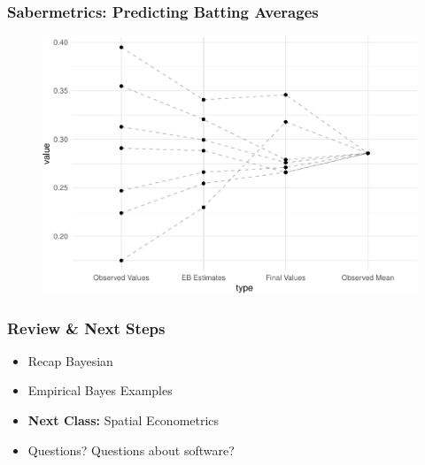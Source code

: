 \documentclass[
  shownotes,
  xcolor={svgnames},
  hyperref={colorlinks,citecolor=DarkBlue,linkcolor=DarkRed,urlcolor=DarkBlue}
  ]{beamer}
\begin{document}
\begin{frame}[fragile]
\frametitle{Sabermetrics: Predicting Batting Averages}

\begin{figure}[H] \centering
  \centering
  \includegraphics[scale=0.5]{figures/shrinkage_future}
  \\
  \tiny 
\end{figure}



\end{frame}
\begin{frame}
\frametitle{Review \& Next Steps}
  
  \begin{itemize} 
    \item Recap Bayesian
    \medskip
    \item Empirical Bayes Examples
    
  \bigskip  

  
  \item  {\bf Next Class:} Spatial Econometrics
  \bigskip
  \item Questions? Questions about software? 
  
  \end{itemize}


\end{frame}


\end{document}
